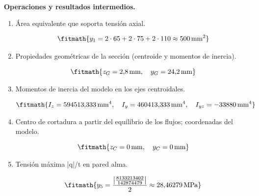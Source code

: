 \noindent\textbf{Operaciones y resultados intermedios.}

\begin{enumerate}

\item Área equivalente que soporta tensión axial.

\[\fitmath{y_{1}=2\cdot 65+2\cdot 75+2\cdot 110\approx 500\,\mathrm{mm^{2}}}\]

\item Propiedades geométricas de la sección (centroide y momentos de inercia).

\[\fitmath{z_G=2{,}8\,\mathrm{mm},\quad y_G=24{,}2\,\mathrm{mm}}\]

\item Momentos de inercia del modelo en los ejes centroidales.

\[\fitmath{I_z=594513{,}333\,\mathrm{mm}^{4},\quad I_y=460413{,}333\,\mathrm{mm}^{4},\quad I_{yz}=-33880\,\mathrm{mm}^{4}}\]

\item Centro de cortadura a partir del equilibrio de los flujos; coordenadas del modelo.

\[\fitmath{z_C=0\,\mathrm{mm},\quad y_C=0\,\mathrm{mm}}\]

\item Tensión máxima |q|/t en pared alma.

\[\fitmath{y_{5}=\frac{\left|\frac{8133213402}{142874479}\right|}{2}\approx 28{,}46279\,\mathrm{MPa}}\]

\end{enumerate}
